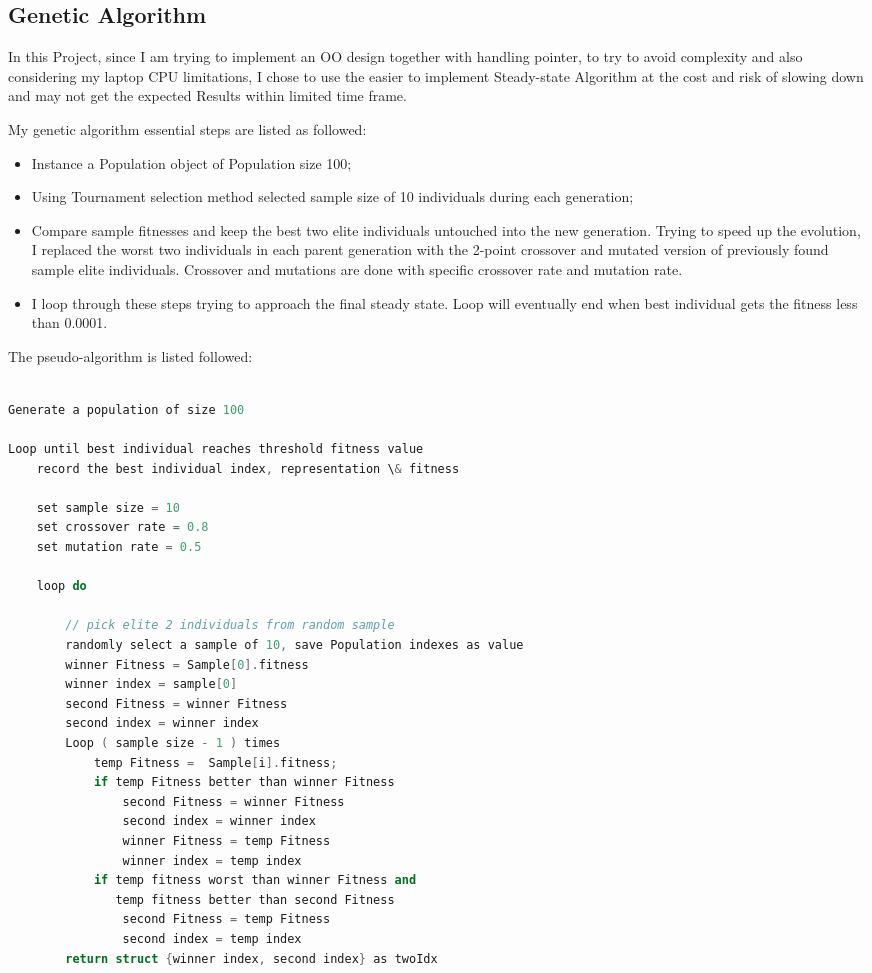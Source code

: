 \documentclass[b5paper,11pt, abstraction, titlepage]{scrartcl}
\begin{document}
\begin{CJK}{UTF8}{gbsn}
\subsection{Genetic Algorithm}
In this Project, since I am trying to implement an OO design together with handling pointer, to try to avoid complexity and also considering my laptop CPU limitations, I chose to use the easier to implement Steady-state Algorithm at the cost and risk of slowing down and may not get the expected Results within limited time frame.

My genetic algorithm essential steps are listed as followed:
\begin{itemize}
  \itemsep=-3pt
\item Instance a Population object of Population size 100;
\item Using Tournament selection method selected sample size of 10 individuals during each generation; 
\item Compare sample fitnesses and keep the best two elite individuals untouched into the new generation. Trying to speed up the evolution, I replaced the worst two individuals in each parent generation with the 2-point crossover and mutated version of previously found sample elite individuals. Crossover and mutations are done with specific crossover rate and mutation rate. 
\item I loop through these steps trying to approach the final steady state. Loop will eventually end when best individual gets the fitness less than 0.0001.
\end{itemize}

The pseudo-algorithm is listed followed:  %
\begin{lstlisting}[language=c++]

Generate a population of size 100

Loop until best individual reaches threshold fitness value
    record the best individual index, representation \& fitness

    set sample size = 10
    set crossover rate = 0.8
    set mutation rate = 0.5

    loop do

        // pick elite 2 individuals from random sample
        randomly select a sample of 10, save Population indexes as value
        winner Fitness = Sample[0].fitness
        winner index = sample[0]
        second Fitness = winner Fitness
        second index = winner index
        Loop ( sample size - 1 ) times
            temp Fitness =  Sample[i].fitness;
            if temp Fitness better than winner Fitness
                second Fitness = winner Fitness
                second index = winner index
                winner Fitness = temp Fitness
                winner index = temp index
            if temp fitness worst than winner Fitness and
               temp fitness better than second Fitness
                second Fitness = temp Fitness
                second index = temp index
        return struct {winner index, second index} as twoIdx


\end{lstlisting}
\end{CJK}
\end{document}
